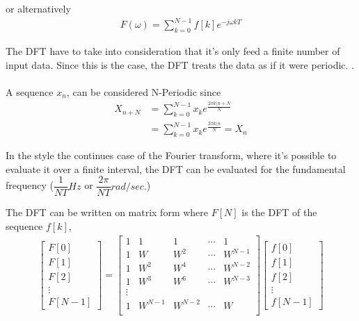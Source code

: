 or alternatively
\begin{align*}
	F(\omega) = \sum_{k=0}^{N-1}f[k]e^{-j\omega k T}
\end{align*} \cite{DFT_OX}


The DFT have to take into consideration that it's only feed a finite number of input data. Since this is the case, the DFT treats the data as if it were periodic. 
.
\\\\
A sequence $x_n$, can be considered N-Periodic since 
\begin{align*}
	X_{n+N} 
	&= \sum_{k=0}^{N-1}x_k e^{\frac{2 \pi k (n+N}{N}}\\
	&= \sum_{k=0}^{N-1}x_k e^{\frac{2 \pi k (n}{N}} = X_n
\end{align*} \cite{FSP}

In the style the continues case of the Fourier transform, where it's possible to evaluate it over a finite interval, the DFT can be evaluated for the fundamental frequency ($\dfrac{1}{NT} Hz$ or $\dfrac{2\pi}{NT}rad/sec.$) \cite{DFT_OX} 
%

The DFT can be written on matrix form where $F[N]$ is the DFT of the sequence $f[k]$,
\begin{align} \label{eq:DFT_matrix}
	\begin{bmatrix}
		F[0]\\ F[1]\\ F[2]\\ \vdots \\ F[N-1]
	\end{bmatrix}
	=
	\begin{bmatrix}
		1 & 1 	& 1   	& \cdots & 1\\
		1 & W 	& W^2 	& \cdots & W^{N-1}\\
		1 & W^2	& W^4	& \cdots & W^{N-2}\\
		1 & W^3	& W^6	& \cdots & W^{N-3}\\
		\vdots\\
		1 & W^{N-1}	& W^{N-2}	& \cdots & W\\
	\end{bmatrix}
	\begin{bmatrix}
		f[0]\\ f[1]\\ f[2]\\ \vdots \\ f[N-1]
	\end{bmatrix}
\end{align}

